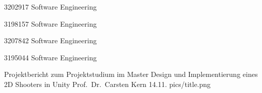 \documentclass[12pt,a4paper,bibliography=totocnumbered,listof=totocnumbered]{scrartcl}
\begin{document}

{3202917}
{Software Engineering}

{3198157}
{Software Engineering}

{3207842}
{Software Engineering}

{3195044}
{Software Engineering}

{Projektbericht zum Projektstudium im Master}	            %
{Design und Implementierung eines 2D Shooters in Unity}		%
{Prof.\ Dr.\ Carsten Kern}		%
{14.11.\the\year}				%
{pics/title.png}			%


\setcounter{page}{1} 
\tableofcontents
\pagebreak

\lhead{}
\listoffigures
\pagebreak
\end{document}
